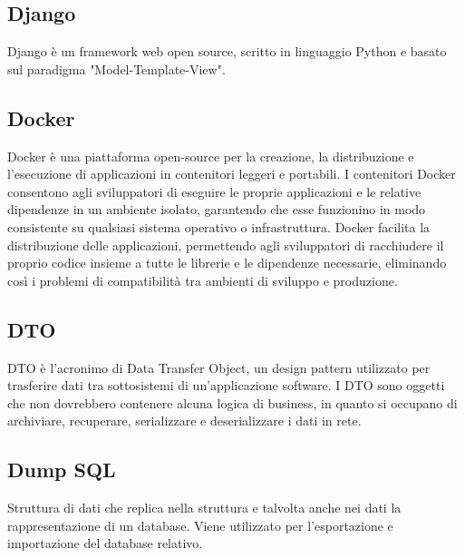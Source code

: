 \subsection*{Django}
\par Django è un framework web open source, scritto in linguaggio Python e basato sul paradigma "Model-Template-View".

\vspace{2em}
\subsection*{Docker}
Docker è una piattaforma open-source per la creazione, la distribuzione e l'esecuzione di applicazioni in contenitori leggeri e portabili. I contenitori Docker consentono agli sviluppatori di eseguire le proprie applicazioni e le relative dipendenze in un ambiente isolato, garantendo che esse funzionino in modo consistente su qualsiasi sistema operativo o infrastruttura. Docker facilita la distribuzione delle applicazioni, permettendo agli sviluppatori di racchiudere il proprio codice insieme a tutte le librerie e le dipendenze necessarie, eliminando così i problemi di compatibilità tra ambienti di sviluppo e produzione.

\vspace{2em}
\subsection*{DTO}
DTO è l'acronimo di Data Transfer Object, un design pattern utilizzato per trasferire dati tra sottosistemi di un'applicazione software. I DTO sono oggetti che non dovrebbero contenere alcuna logica di business, in quanto si occupano di archiviare, recuperare, serializzare e deserializzare i dati in rete.

\vspace{2em}
\subsection*{Dump SQL}
Struttura di dati che replica nella struttura e talvolta anche nei dati la rappresentazione di un database. Viene utilizzato per l'esportazione e importazione del database relativo.
